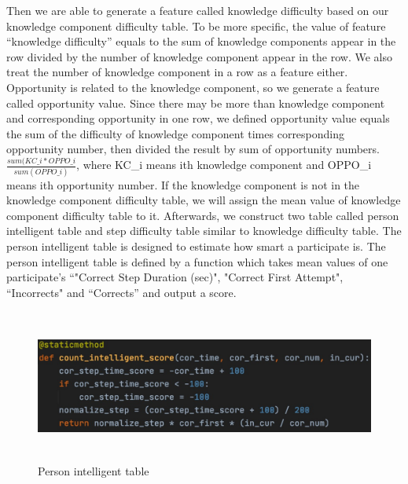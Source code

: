 \documentclass{article}
\begin{document}
Then we are able to generate a feature called knowledge difficulty based on our knowledge component difficulty table. To be more specific, the value of feature “knowledge difficulty” equals to the sum of knowledge components appear in the row divided by the number of knowledge component appear in the row. We also treat the number of knowledge component in a row as a feature either.\\
Opportunity is related to the knowledge component, so we generate a feature called opportunity value. Since there may be more than knowledge component and corresponding opportunity in one row, we defined opportunity value equals the sum of the difficulty of knowledge component times corresponding opportunity number, then divided the result by sum of opportunity numbers.$\frac{sum(KC\_i * OPPO\_i}{sum(OPPO\_i)}$, where KC\_i means ith knowledge component and OPPO\_i means ith opportunity number. If the knowledge component is not in the knowledge component difficulty table, we will assign the mean value of knowledge component difficulty table to it. Afterwards, we construct two table called person intelligent table and step difficulty table similar to knowledge difficulty table. The person intelligent table is designed to estimate how smart a participate is. The person intelligent table is defined by a function which takes mean values of one participate’s “"Correct Step Duration (sec)", "Correct First Attempt", “Incorrects" and “Corrects” and output a score.

\begin{figure}[h]
\centering
\includegraphics[width=12cm,height=5cm]{figure4.jpg}
\caption{Person intelligent table}
\end{figure}
\end{document}
